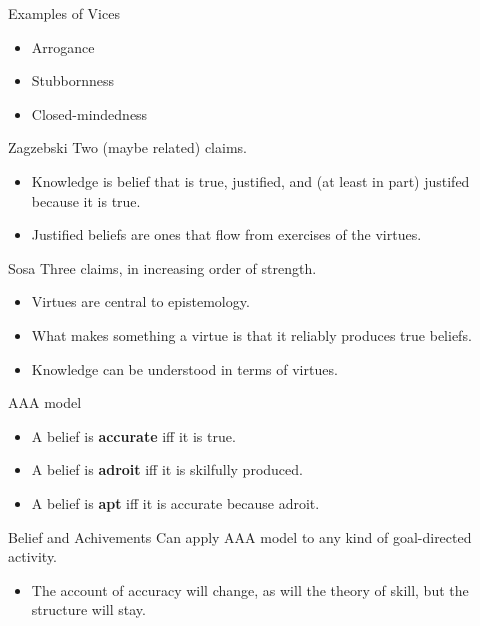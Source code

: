 \documentclass[
  17pt,
  letterpaper,
  ignorenonframetext,
  aspectratio=169,
  handout]{beamer}
\providecommand{\tightlist}{%
  \setlength{\itemsep}{0pt}\setlength{\parskip}{0pt}}\usepackage{longtable,booktabs,array}
\begin{document}
\begin{frame}{Examples of Vices}
\protect\hypertarget{examples-of-vices}{}
\begin{itemize}[<+->]
\tightlist
\item
  Arrogance
\item
  Stubbornness
\item
  Closed-mindedness
\end{itemize}
\end{frame}

\begin{frame}{Zagzebski}
\protect\hypertarget{zagzebski-1}{}
Two (maybe related) claims.

\begin{itemize}[<+->]
\tightlist
\item
  Knowledge is belief that is true, justified, and (at least in part)
  justifed because it is true.
\item
  Justified beliefs are ones that flow from exercises of the virtues.
\end{itemize}
\end{frame}

\begin{frame}{Sosa}
\protect\hypertarget{sosa}{}
Three claims, in increasing order of strength.

\begin{itemize}[<+->]
\tightlist
\item
  Virtues are central to epistemology.
\item
  What makes something a virtue is that it reliably produces true
  beliefs.
\item
  Knowledge can be understood in terms of virtues.
\end{itemize}
\end{frame}

\begin{frame}{AAA model}
\protect\hypertarget{aaa-model}{}
\begin{itemize}[<+->]
\tightlist
\item
  A belief is \textbf{accurate} iff it is true.
\item
  A belief is \textbf{adroit} iff it is skilfully produced.
\item
  A belief is \textbf{apt} iff it is accurate because adroit.
\end{itemize}
\end{frame}

\begin{frame}{Belief and Achivements}
\protect\hypertarget{belief-and-achivements}{}
Can apply AAA model to any kind of goal-directed activity.

\begin{itemize}[<+->]
\tightlist
\item
  The account of accuracy will change, as will the theory of skill, but
  the structure will stay.
\end{itemize}
\end{frame}
\end{document}
